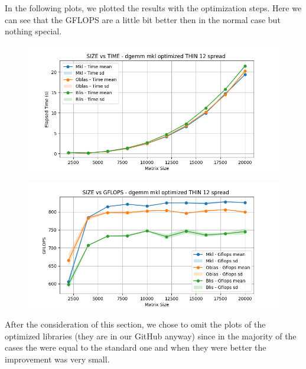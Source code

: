 \documentclass[12pt, titlepage]{report}
\begin{document}
In the following plots, we plotted the results with the optimization steps. Here we can see that the GFLOPS are a little bit better then in the normal case but nothing special.  

\begin{figure}[H]
    \centering
    \includegraphics[width=\textwidth]{THIN 12/dgemm_mkl_optimized_THIN_12_spread_time.png}
\end{figure}

\begin{figure}[H]
    \centering
    \includegraphics[width=\textwidth]{THIN 12/dgemm_mkl_optimized_THIN_12_spread_gflops.png}
\end{figure}

After the consideration of this section, we chose to omit the plots of the optimized libraries (they are in our GitHub anyway) since in the majority of the cases the were equal to the standard one and when they were better the improvement was very small.
\end{document}
